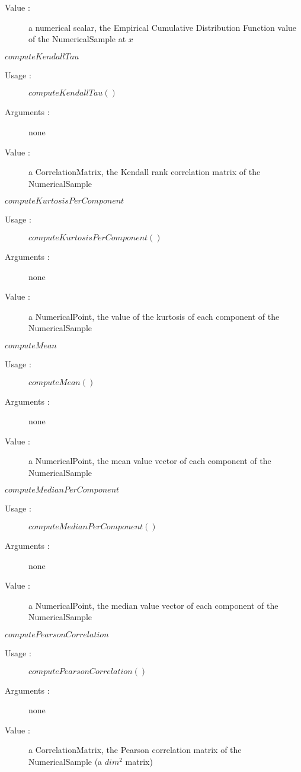 \begin{description}
\begin{description}
\begin{description}
    \item[Value :] a numerical scalar, the Empirical Cumulative Distribution Function value of the NumericalSample at $x$
    \end{description}
    \bigskip


  \item $computeKendallTau$
    \begin{description}
    \item[Usage :] $computeKendallTau()$
    \item[Arguments :] none
    \item[Value :] a CorrelationMatrix,  the Kendall rank correlation matrix of the NumericalSample
    \end{description}
    \bigskip


  \item $computeKurtosisPerComponent$
    \begin{description}
    \item[Usage :] $computeKurtosisPerComponent()$
    \item[Arguments :] none
    \item[Value :] a NumericalPoint,  the value of the kurtosis of each component of the NumericalSample
    \end{description}
    \bigskip

  \item $computeMean$
    \begin{description}
    \item[Usage :] $computeMean()$
    \item[Arguments :] none
    \item[Value :] a NumericalPoint, the mean value vector of each component of the NumericalSample
    \end{description}
    \bigskip


  \item $computeMedianPerComponent$
    \begin{description}
    \item[Usage :] $computeMedianPerComponent()$
    \item[Arguments :] none
    \item[Value :] a NumericalPoint, the median value vector of each component of the NumericalSample
    \end{description}
    \bigskip

  \item $computePearsonCorrelation$
    \begin{description}
    \item[Usage :] $computePearsonCorrelation()$
    \item[Arguments :] none
    \item[Value :] a CorrelationMatrix, the Pearson correlation matrix of the NumericalSample (a $dim^2$ matrix)
    \end{description}
    \bigskip


\end{description}
\end{description}

